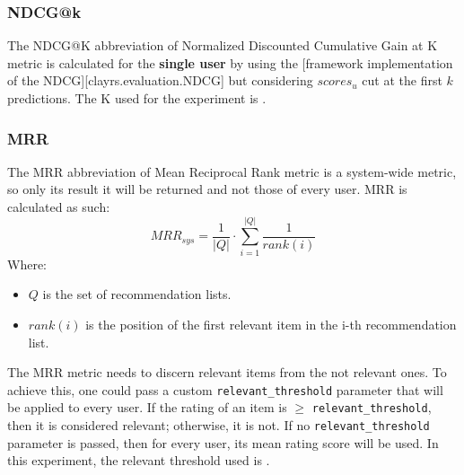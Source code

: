 \subsubsection{NDCG@k}\label{subsubsec:ndcg-k}
The NDCG@K abbreviation of Normalized Discounted Cumulative Gain at K metric is calculated for the \textbf{single user}
by using the [framework implementation of the NDCG][clayrs.evaluation.NDCG] but considering $scores_{u}$ cut at the
first $k$ predictions.
The K used for the experiment is .
\hfill\break
\hfill\break

\subsubsection{MRR}\label{subsubsec:mrr}
The MRR abbreviation of Mean Reciprocal Rank metric is a system-wide metric, so only its result it will be returned
and not those of every user.
MRR is calculated as such:
\hfill\break
\hfill\break
    \[
        MRR_{sys} = \frac{1}{|Q|}\cdot\sum_{i=1}^{|Q|}\frac{1}{rank(i)}
    \]
\hfill\break
\hfill\break
    Where:
\begin{itemize}
    \item $Q$ is the set of recommendation lists.
    \item $rank(i)$ is the position of the first relevant item in the i-th recommendation list.
\end{itemize}
\hfill\break
\hfill\break
The MRR metric needs to discern relevant items from the not relevant ones.
To achieve this, one could pass a custom \texttt{relevant\_threshold} parameter that will be applied to every user.
If the rating of an item is $\geq$ \texttt{relevant\_threshold}, then it is considered relevant; otherwise, it is not.
If no \texttt{relevant\_threshold} parameter is passed, then for every user, its mean rating score will be used.
In this experiment, the relevant threshold used is
.
\hfill\break
\hfill\break

